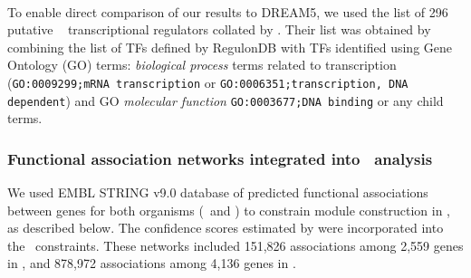 \paragraph{\eco}
\label{section:eco_tfs}

To enable direct comparison of our results to DREAM5, we used the list
of 296 putative \eco~ transcriptional regulators collated
by \cite{Marbach2012}. Their list was obtained by combining the list
of TFs defined by RegulonDB \cite{Gama-Castro2011} with TFs identified
using Gene Ontology (GO) terms: \textit{biological process} terms
related to transcription (\texttt{GO:0009299;mRNA transcription}
or \texttt{GO:0006351;transcription, DNA dependent}) and
GO \textit{molecular function}
\texttt{GO:0003677;DNA binding} or any child terms.

\subsubsection{Functional association networks integrated into \cm~analysis}

We used EMBL STRING \cite{Szklarczyk2011} v9.0 database
of predicted functional associations between genes for both organisms
(\halo~and \eco) to constrain module construction in \cm, as described
below. The confidence scores estimated by \cite{Szklarczyk2011} were
incorporated into the \cm~constraints. These
networks included 151,826 associations among 2,559 genes in \halo, and
878,972 associations among 4,136 genes in \eco.

